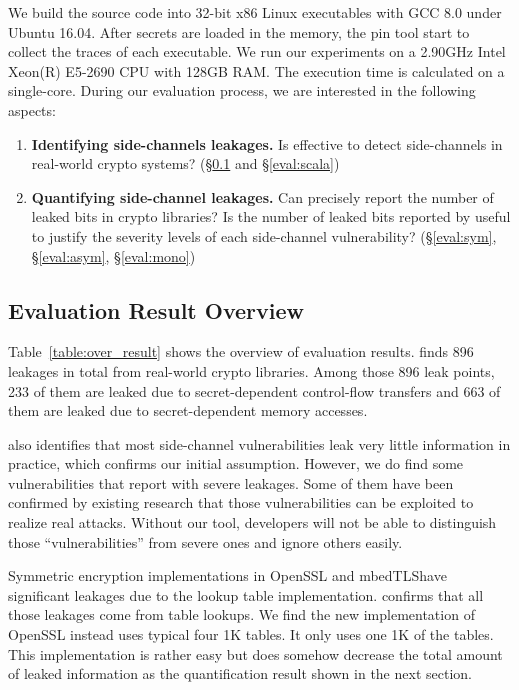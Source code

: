 We build the source code into 32-bit x86 Linux executables with GCC 8.0
under Ubuntu 16.04. After secrets are loaded in the memory, 
the pin tool start to collect the traces of each executable.
We run our experiments on a 2.90GHz Intel Xeon(R) E5-2690 CPU with 128GB
RAM. The execution time is calculated on a single-core.
During our evaluation process, we are interested in the following
aspects:
\begin{enumerate}
    \item  \textbf{Identifying side-channels leakages.}
          Is \tool{} effective to detect side-channels in real-world crypto
          systems? (\S\ref{sec:eval_overview} and \S\ref{eval:scala})
    \item  \textbf{Quantifying side-channel leakages.}
          Can \tool{} precisely report the number of leaked bits in crypto
          libraries? Is the number of leaked bits reported by \tool{} useful
          to justify the severity levels of each side-channel vulnerability?
          (\S\ref{eval:sym}, \S\ref{eval:asym}, \S\ref{eval:mono})
\end{enumerate}

\subsection{Evaluation Result Overview} \label{sec:eval_overview}
Table~\ref{table:over_result} shows the overview of evaluation results. \tool{} finds
896 leakages in total from real-world crypto libraries. Among those 896
leak points, 233 of them are leaked due to secret-dependent control-flow
transfers and 663 of them are leaked due to secret-dependent memory accesses.

\tool{} also identifies that most side-channel
vulnerabilities leak very little information in practice, which confirms our
initial assumption.  
However, we do find some vulnerabilities that \tool{} report with severe
leakages. Some of them have been confirmed by existing research that those
vulnerabilities can be exploited to realize real attacks.
Without our tool, developers will not be able to
distinguish those ``vulnerabilities'' from severe ones and ignore others easily.

Symmetric encryption implementations in OpenSSL and mbedTLS\@ have significant
leakages due to the lookup table implementation. 
\tool{} confirms that all those leakages come from table
lookups. We find the new
implementation of OpenSSL instead uses typical four 1K tables. It only uses one 1K
of the tables. This implementation is rather easy but does somehow decrease the total
amount of leaked information as the quantification result shown in the next
section.

